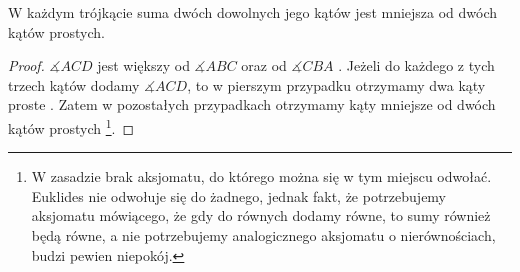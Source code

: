 \documentclass[12pt, a4paper]{scrartcl}
\begin{document}
\begin{theorem}
    W każdym trójkącie suma dwóch dowolnych jego kątów jest mniejsza od dwóch
    kątów prostych.

    \begin{figure}[!h]
        \begin{center}
        \end{center}
    \end{figure}

    \begin{proof}
        \(\measuredangle ACD\) jest większy od \(\measuredangle ABC\) oraz od
        \(\measuredangle CBA\) . Jeżeli do każdego z tych trzech
        kątów dodamy \(\measuredangle ACD\), to w pierszym przypadku otrzymamy
        dwa kąty proste . Zatem w pozostałych przypadkach otrzymamy
        kąty mniejsze od dwóch kątów prostych \footnote{
            W zasadzie brak aksjomatu, do którego można się w tym miejscu
            odwołać. Euklides nie odwołuje się do żadnego, jednak fakt, że
            potrzebujemy aksjomatu mówiącego, że gdy do równych dodamy równe,
            to sumy również będą równe, a nie potrzebujemy analogicznego
            aksjomatu o nierównościach, budzi pewien niepokój.
        }.
    \end{proof}
\end{theorem}
\end{document}
